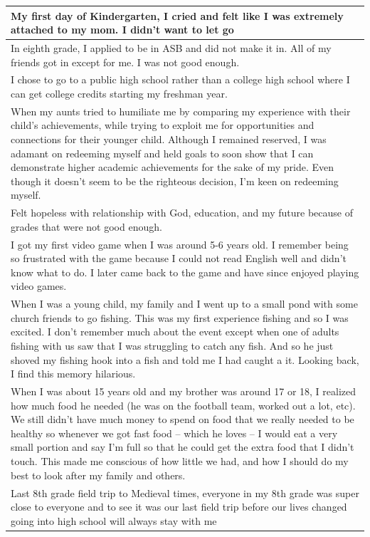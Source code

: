 \documentclass[
  .7em,
  letterpaper,
  DIV=11,
  numbers=noendperiod]{scrartcl}
\begin{document}
\begin{table}
\begin{tabular}{l}
\hline
My first day of Kindergarten, I cried and felt like I was extremely attached to my mom. I didn't want to let go\\
\hline
In eighth grade, I applied to be in ASB and did not make it in. All of my friends got in except for me. I was not good enough.\\
\hline
I chose to go to a public high school rather than a college high school where I can get college credits starting my freshman year.\\
\hline
When my aunts tried to humiliate me by comparing my experience with their child's achievements, while trying to exploit me for opportunities and connections for their younger child. Although I remained reserved, I was adamant on redeeming myself and held goals to soon show that I can demonstrate higher academic achievements for the sake of my pride. Even though it doesn't seem to be the righteous decision, I'm keen on redeeming myself.\\
\hline
Felt hopeless with relationship with God, education, and my future because of grades that were not good enough.\\
\hline
I got my first video game when I was around 5-6 years old. I remember being so frustrated with the game because I could not read English well and didn’t know what to do. I later came back to the game and have since enjoyed playing video games.\\
\hline
When I was a young child, my family and I went up to a small pond with some church friends to go fishing. This was my first experience fishing and so I was excited. I don’t remember much about the event except when one of adults fishing with us saw that I was struggling to catch any fish. And so he just shoved my fishing hook into a fish and told me I had caught a it. Looking back, I find this memory hilarious.\\
\hline
When I was about 15 years old and my brother was around 17 or 18, I realized how much food he needed (he was on the football team, worked out a lot, etc). We still didn't have much money to spend on food that we really needed to be healthy so whenever we got fast food -- which he loves -- I would eat a very small portion and say I'm full so that he could get the extra food that I didn't touch. This made me conscious of how little we had, and how I should do my best to look after my family and others.\\
\hline
Last 8th grade field trip to Medieval times, everyone in my 8th grade was super close to everyone and to see it was our last field trip before our lives changed going into high school will always stay with me\\

\end{tabular}
\end{table}
\end{document}
